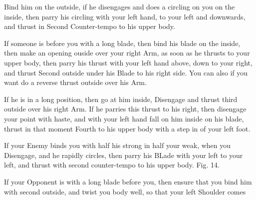 \newpage


\newpage


\exercise{}
Bind him on the outside, if he disengages and does a circling on you
on the inside, then parry his circling with your left hand, to your
left and downwards, and thrust in Second Counter-tempo to his upper
body.

\exercise{}
If someone is before you with a long blade, then bind his blade on the
inside, then make an opening ouside over your right Arm, as soon as he
thrusts to your upper body, then parry his thrust with your left hand
above, down to your right, and thrust Second outside under his Blade
to his right side. You can also if you want do a reverse thrust
outside over his Arm.

\exercise{}
If he is in a long position, then go at him inside, Disengage and
thrust third outside over his right Arm. If he parries this thrust to
his right, then disengage your point with haste, and with your left
hand fall on him inside on his blade, thrust in that moment Fourth to
his upper body with a step in of your left foot.

\exercise{}
If your Enemy binds you with half his strong in half your weak, when
you Disengage, and he rapidly circles, then parry his BLade with your
left to your left, and thrust with second counter-tempo to his upper
body. Fig. 14.

\exercise{}
If your Opponent is with a long blade before you, then ensure that you
bind him with second outside, and twist you body well, so that your
left Shoulder comes
